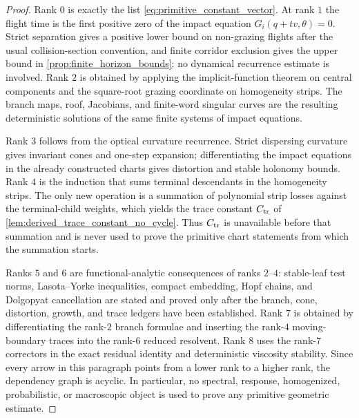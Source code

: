 \documentclass[12pt, letterpaper]{amsart}
\theoremstyle{plain}
\theoremstyle{definition}
\theoremstyle{remark}
\begin{document}
\begin{proof}
Rank $0$ is exactly the list \eqref{eq:primitive_constant_vector}.  At rank $1$
the flight time is the first positive zero of the impact equation
$G_i(q+t v,\theta)=0$.  Strict separation gives a positive lower bound on
non-grazing flights after the usual collision-section convention, and finite
corridor exclusion gives the upper bound in \cref{prop:finite_horizon_bounds};
no dynamical recurrence estimate is involved.  Rank $2$ is obtained by applying
the implicit-function theorem on central components and the square-root grazing
coordinate on homogeneity strips.  The branch maps, roof, Jacobians, and
finite-word singular curves are the resulting deterministic solutions of the
same finite systems of impact equations.

Rank $3$ follows from the optical curvature recurrence.  Strict dispersing
curvature gives invariant cones and one-step expansion; differentiating the
impact equations in the already constructed charts gives distortion and stable
holonomy bounds.  Rank $4$ is the induction that sums terminal descendants in
the homogeneity strips.  The only new operation is a summation of polynomial
strip losses against the terminal-child weights, which yields the trace constant
$C_{\rm tr}$ of \cref{lem:derived_trace_constant_no_cycle}.  Thus $C_{\rm tr}$
is unavailable before that summation and is never used to prove the primitive
chart statements from which the summation starts.

Ranks $5$ and $6$ are functional-analytic consequences of ranks $2$--$4$:
stable-leaf test norms, Lasota--Yorke inequalities, compact embedding, Hopf
chains, and Dolgopyat cancellation are stated and proved only after the branch,
cone, distortion, growth, and trace ledgers have been established.  Rank $7$ is
obtained by differentiating the rank-$2$ branch formulae and inserting the
rank-$4$ moving-boundary traces into the rank-$6$ reduced resolvent.  Rank $8$
uses the rank-$7$ correctors in the exact residual identity and deterministic
viscosity stability.  Since every arrow in this paragraph points from a lower
rank to a higher rank, the dependency graph is acyclic.  In particular, no
spectral, response, homogenized, probabilistic, or macroscopic object is used to
prove any primitive geometric estimate.
\end{proof}
\end{document}
